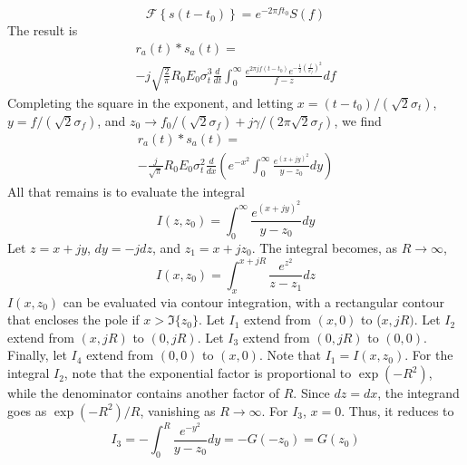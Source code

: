 \documentclass[amsmath,amssymb,aps,prd,10pt,twocolumn,showkeys]{revtex4}
\begin{document}
\begin{itemize}
\begin{equation}
\mathcal{F}\left\lbrace s(t-t_0)\right\rbrace = e^{-2\pi f t_0} S(f)
\end{equation}
The result is
\begin{multline}
r_a(t) * s_a(t) = \\ -j \sqrt{\frac{2}{\pi}} R_0 E_0 \sigma_t^3 \frac{d}{dt} \int_0^\infty \frac{e^{2\pi j f(t-t_0)} e^{-\frac{1}{2}\left(\frac{f}{\sigma_f}\right)^2}}{f-z}df
\end{multline}
Completing the square in the exponent, and letting $x = (t-t_0)/(\sqrt{2}\sigma_t)$, $y = f/(\sqrt{2}\sigma_f)$, and $z_0 \to f_0/(\sqrt{2}\sigma_f)+j \gamma/(2\pi\sqrt{2}\sigma_f)$, we find
\begin{multline}
r_a(t) * s_a(t) = \\ -\frac{j}{\sqrt{\pi}} R_0 E_0 \sigma_t^2 \frac{d}{dx} \left(e^{-x^2} \int_0^{\infty} \frac{e^{(x+jy)^2}}{y-z_0} dy \right) \label{eq:withI}
\end{multline}
All that remains is to evaluate the integral
\begin{equation}
I(z,z_0) = \int_0^{\infty} \frac{e^{(x+jy)^2}}{y-z_0} dy
\end{equation}
Let $z = x+jy$, $dy = -jdz$, and $z_1 = x+jz_0$.  The integral becomes, as $R \to \infty$,
\begin{equation}
I(x,z_0) = \int_{x}^{x+jR} \frac{e^{z^2}}{z - z_1} dz
\end{equation}
$I(x,z_0)$ can be evaluated via contour integration, with a rectangular contour that encloses the pole if $x > \Im\lbrace z_0\rbrace$.  Let $I_1$ extend from $(x,0)$ to ($x,jR)$.  Let $I_2$ extend from $(x,jR)$ to $(0,jR)$.  Let $I_3$ extend from $(0,jR)$ to $(0,0)$.  Finally, let $I_4$ extend from $(0,0)$ to $(x,0)$.  Note that $I_1 = I(x,z_0)$.  For the integral $I_2$, note that the exponential factor is proportional to $\exp(-R^2)$, while the denominator contains another factor of $R$.  Since $dz = dx$, the integrand goes as $\exp(-R^2)/R$, vanishing as $R \to \infty$.  For $I_3$, $x=0$.  Thus, it reduces to
\begin{equation}
I_3 = - \int_{0}^{R} \frac{e^{-y^2}}{y-z_0} dy = -G(-z_0) = G(z_0)
\end{equation}


\end{itemize}
\end{document}
